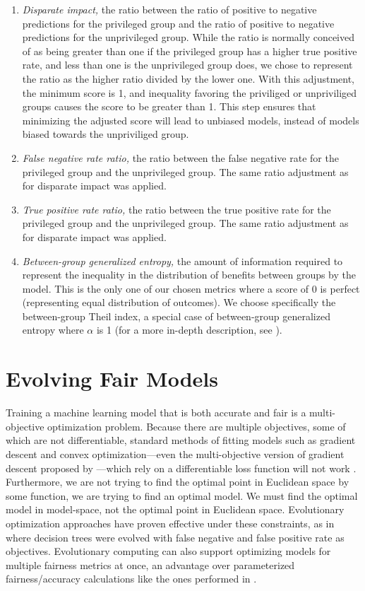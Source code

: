 \documentclass{elsarticle}
\begin{document}
\begin{enumerate}
	\item \textit{Disparate impact,} the ratio between the ratio of positive to negative predictions for the privileged group and the ratio of positive to negative predictions for the unprivileged group. While the ratio is normally conceived of as being greater than one if the privileged group has a higher true positive rate, and less than one is the unprivileged group does, we chose to represent the ratio as the higher ratio divided by the lower one. With this adjustment, the minimum score is 1, and inequality favoring the priviliged or unpriviliged groups causes the score to be greater than 1. This step ensures that minimizing the adjusted score will lead to unbiased models, instead of models biased towards the unpriviliged group.
	\item \textit{False negative rate ratio,} the ratio between the false negative rate for the privileged group and the unprivileged group. The same ratio adjustment as for disparate impact was applied.
	\item \textit{True positive rate ratio,} the ratio between the true positive rate for the privileged group and the unprivileged group. The same ratio adjustment as for disparate impact was applied.
	\item \textit{Between-group generalized entropy,} the amount of information required to represent the inequality in the distribution of benefits between groups by the model. This is the only one of our chosen metrics where a score of 0 is perfect (representing equal distribution of outcomes). We choose specifically the between-group Theil index, a special case of between-group generalized entropy where $\alpha$ is 1 (for a more in-depth description, see \cite{Speicher:2018}).
\end{enumerate}

\section{Evolving Fair Models}
Training a machine learning model that is both accurate and fair is a multi-objective optimization problem. Because there are multiple objectives, some of which are not differentiable, standard methods of fitting models such as gradient descent and convex optimization---even the multi-objective version of gradient descent proposed by \citep{Desideri:2012}---which rely on a differentiable loss function will not work \citep{Zerbinati:2011}. Furthermore, we are not trying to find the optimal point in Euclidean space by some function, we are trying to find an optimal model. We must find the optimal model in model-space, not the optimal point in Euclidean space. Evolutionary optimization approaches have proven effective under these constraints, as in \citep{Zhao:2007} where decision trees were evolved with false negative and false positive rate as objectives. Evolutionary computing can also support optimizing models for multiple fairness metrics at once, an advantage over parameterized fairness/accuracy calculations like the ones performed in \citep{Friedler:2019}. 
\end{document}
